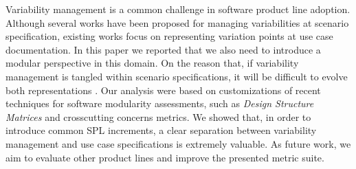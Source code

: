 \documentclass{acm_proc_article-sp}
\begin{document}
Variability management is a common challenge in software product line adoption. Although several 
works have been proposed for managing variabilities at scenario specification, existing works focus on 
representing variation points at use case documentation. In this paper we reported that we also need to 
introduce a modular perspective in this domain. On the reason that, if variability management is tangled within scenario 
specifications, it will be difficult to evolve both representations . Our analysis were based on customizations of recent techniques for software modularity assessments, such as \emph{Design Structure Matrices} and crosscutting concerns metrics. We showed that, in order to introduce common SPL increments, a clear separation between variability management and use case specifications is extremely valuable. As future work, we aim to evaluate other product lines and improve the presented metric suite. 

%

%
%
\end{document}
